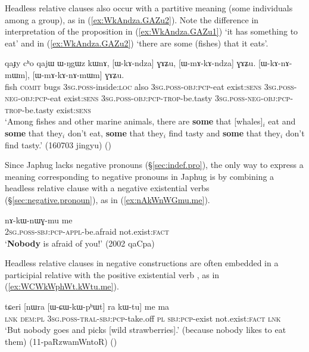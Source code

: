 Headless relative clauses also occur with a partitive meaning (some individuals among a group), as in (\ref{ex:WkAndza.GAZu2}). Note the difference in interpretation of the proposition  in (\ref{ex:WkAndza.GAZu1}) `it has something to eat' and in (\ref{ex:WkAndza.GAZu2}) `there are some (fishes) that it eats'.

\begin{exe}
\ex \label{ex:WkAndza.GAZu2}
\gll qaɟy cʰo qajɯ ɯ-ŋgɯz kɯnɤ, [ɯ-kɤ-ndza] ɣɤʑu, [ɯ-mɤ-kɤ-ndza] ɣɤʑu. [ɯ-kɤ-nɤ-mɯm], [ɯ-mɤ-kɤ-nɤ-mɯm] ɣɤʑu. \\
fish \textsc{comit} bugs \textsc{3sg}.\textsc{poss}-inside:\textsc{loc} also \textsc{3sg}.\textsc{poss}-\textsc{obj}:\textsc{pcp}-eat exist:\textsc{sens}  \textsc{3sg}.\textsc{poss}-\textsc{neg}-\textsc{obj}:\textsc{pcp}-eat exist:\textsc{sens} \textsc{3sg}.\textsc{poss}-\textsc{obj}:\textsc{pcp}-\textsc{trop}-be.tasty \textsc{3sg}.\textsc{poss}-\textsc{neg}-\textsc{obj}:\textsc{pcp}-\textsc{trop}-be.tasty exist:\textsc{sens}  \\
\glt `Among fishes and other marine animals, there are \textbf{some} that [whales]$_i$ eat and \textbf{some} that they$_i$ don't eat, \textbf{some} that they$_i$ find tasty and \textbf{some} that they$_i$ don't find tasty.' (160703 jingyu)
()
\end{exe}

Since Japhug lacks negative pronouns (§\ref{sec:indef.pro}), the only way to express a meaning corresponding to negative pronouns in Japhug is by combining a headless relative clause with a negative existential verbs (§\ref{sec:negative.pronoun}), as in (\ref{ex:nAkWnWGmu.me}).

\begin{exe}
\ex \label{ex:nAkWnWGmu.me}
\gll nɤ-kɯ-nɯɣ-mu me \\
\textsc{2sg}.\textsc{poss}-\textsc{sbj}:\textsc{pcp}-\textsc{appl}-be.afraid not.exist:\textsc{fact} \\
\glt `\textbf{Nobody} is afraid of you!' (2002 qaCpa)
\end{exe}


Headless relative clauses in negative constructions are often embedded in a participial relative with the positive existential verb , as in (\ref{ex:WCWkWphWt.kWtu.me}).

\begin{exe}
\ex \label{ex:WCWkWphWt.kWtu.me}
\gll tɕeri [nɯra [ɯ-ɕɯ-kɯ-pʰɯt] ra kɯ-tu] me ma \\
\textsc{lnk} \textsc{dem}:\textsc{pl} \textsc{3sg}.\textsc{poss}-\textsc{tral}-\textsc{sbj}:\textsc{pcp}-take.off \textsc{pl} \textsc{sbj}:\textsc{pcp}-exist not.exist:\textsc{fact} \textsc{lnk} \\
\glt `But nobody goes and picks [wild strawberries].' (because nobody likes to eat them) (11-paRzwamWntoR)
()
\end{exe}

